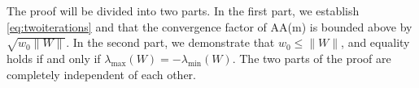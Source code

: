 \documentclass[11pt]{article}
\begin{document}

The proof will be divided into two parts. In the first part, we establish \eqref{eq:twoiterations} and that the convergence factor of AA(m) is bounded above by $\sqrt{w_0\|W\|}$. In the second part, we demonstrate that $w_0 \leq \|W\|$, and equality holds if and only if $\lambda_{\max}(W) = -\lambda_{\min}(W)$.  The two parts of the proof are completely independent of each other.
 
\end{document}
